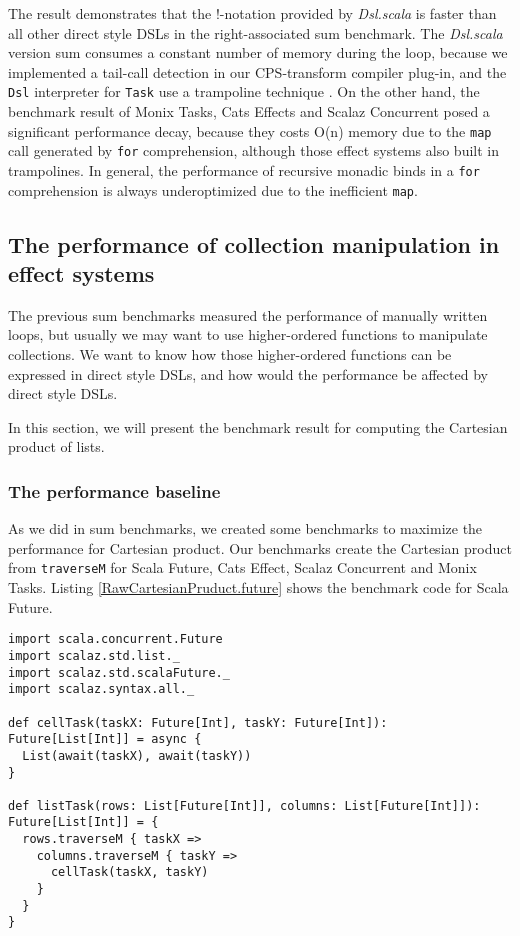 The result demonstrates that the !-notation provided by \textit{Dsl.scala} is faster than all other direct style DSLs in the right-associated sum benchmark. The \textit{Dsl.scala} version sum consumes a constant number of memory during the loop, because we implemented a tail-call detection in our CPS-transform compiler plug-in, and the \lstinline{Dsl} interpreter for \lstinline{Task} use a trampoline technique \cite{tarditi1992no}. On the other hand, the benchmark result of Monix Tasks, Cats Effects and Scalaz Concurrent posed a significant performance decay, because they costs O(n) memory due to the \lstinline{map} call generated by \lstinline{for} comprehension, although those effect systems also built in trampolines. In general, the performance of recursive monadic binds in a \lstinline{for} comprehension is always underoptimized due to the inefficient \lstinline{map}.

\subsection{The performance of collection manipulation in effect systems}

The previous sum benchmarks measured the performance of manually written loops, but usually we may want to use higher-ordered functions to manipulate collections. We want to know how those higher-ordered functions can be expressed in direct style DSLs, and how would the performance be affected by direct style DSLs.

In this section, we will present the benchmark result for computing the Cartesian product of lists.

\subsubsection{The performance baseline}

As we did in sum benchmarks, we created some benchmarks to maximize the performance for Cartesian product. Our benchmarks create the Cartesian product from \lstinline{traverseM} for Scala Future, Cats Effect, Scalaz Concurrent and Monix Tasks. Listing \ref{RawCartesianPruduct.future} shows the benchmark code for Scala Future.

\begin{lstlisting}[float=htbp,caption={Cartesian product for Scala Future, based on \lstinline{traverseM}},label={RawCartesianPruduct.future}]
import scala.concurrent.Future
import scalaz.std.list._
import scalaz.std.scalaFuture._
import scalaz.syntax.all._

def cellTask(taskX: Future[Int], taskY: Future[Int]): Future[List[Int]] = async {
  List(await(taskX), await(taskY))
}

def listTask(rows: List[Future[Int]], columns: List[Future[Int]]): Future[List[Int]] = {
  rows.traverseM { taskX =>
    columns.traverseM { taskY =>
      cellTask(taskX, taskY)
    }
  }
}
\end{lstlisting}

